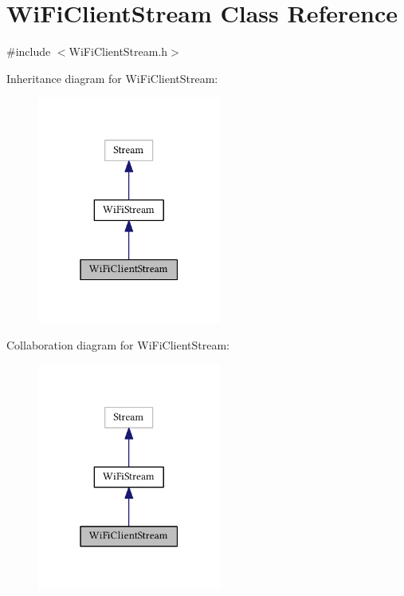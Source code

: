 \hypertarget{class_wi_fi_client_stream}{}\section{Wi\+Fi\+Client\+Stream Class Reference}
\label{class_wi_fi_client_stream}


{\ttfamily \#include $<$Wi\+Fi\+Client\+Stream.\+h$>$}



Inheritance diagram for Wi\+Fi\+Client\+Stream\+:\nopagebreak
\begin{figure}[H]
\begin{center}
\leavevmode
\includegraphics[width=171pt]{class_wi_fi_client_stream__inherit__graph}
\end{center}
\end{figure}


Collaboration diagram for Wi\+Fi\+Client\+Stream\+:\nopagebreak
\begin{figure}[H]
\begin{center}
\leavevmode
\includegraphics[width=171pt]{class_wi_fi_client_stream__coll__graph}
\end{center}
\end{figure}
